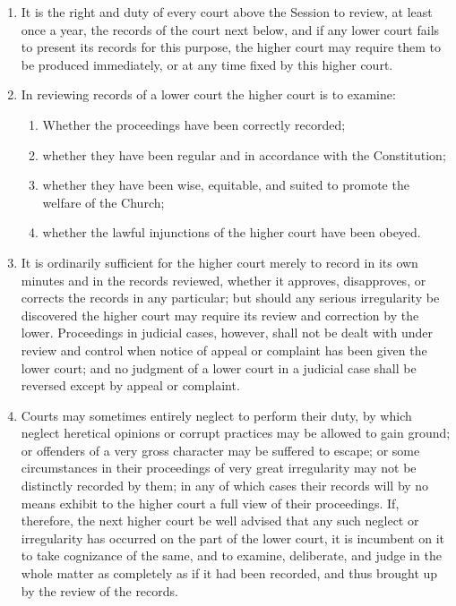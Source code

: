 \documentclass[
]{book}
\providecommand{\tightlist}{%
  \setlength{\itemsep}{0pt}\setlength{\parskip}{0pt}}
\begin{document}
\protect\hypertarget{chapter-slug-43-general-review-and-control}{\href{}{}}

\begin{enumerate}
\def\labelenumi{\arabic{enumi}.}
\tightlist
\item
  \protect\hypertarget{43}{\href{}{}}It is the right and duty of every court above the Session to review, at least once a year, the records of the court next below, and if any lower court fails to present its records for this purpose, the higher court may require them to be produced immediately, or at any time fixed by this higher court.
\item
  In reviewing records of a lower court the higher court is to examine:

  \begin{enumerate}
  \def\labelenumii{\alph{enumii}.}
  \tightlist
  \item
    Whether the proceedings have been correctly recorded;
  \item
    whether they have been regular and in accordance with the Constitution;
  \item
    whether they have been wise, equitable, and suited to promote the welfare of the Church;
  \item
    whether the lawful injunctions of the higher court have been obeyed.
  \end{enumerate}
\item
  It is ordinarily sufficient for the higher court merely to record in its own minutes and in the records reviewed, whether it approves, disapproves, or corrects the records in any particular; but should any serious irregularity be discovered the higher court may require its review and correction by the lower. Proceedings in judicial cases, however, shall not be dealt with under review and control when notice of appeal or complaint has been given the lower court; and no judgment of a lower court in a judicial case shall be reversed except by appeal or complaint.
\item
  Courts may sometimes entirely neglect to perform their duty, by which neglect heretical opinions or corrupt practices may be allowed to gain ground; or offenders of a very gross character may be suffered to escape; or some circumstances in their proceedings of very great irregularity may not be distinctly recorded by them; in any of which cases their records will by no means exhibit to the higher court a full view of their proceedings. If, therefore, the next higher court be well advised that any such neglect or irregularity has occurred on the part of the lower court, it is incumbent on it to take cognizance of the same, and to examine, deliberate, and judge in the whole matter as completely as if it had been recorded, and thus brought up by the review of the records.

\end{enumerate}
\end{document}
